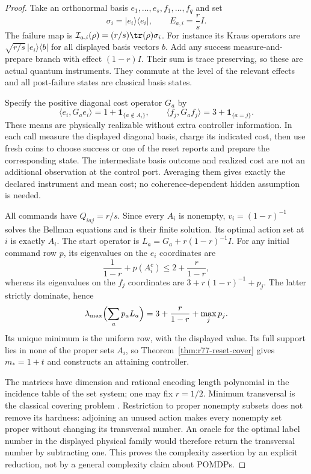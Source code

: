 \begin{proof}
Take an orthonormal basis $e_1,\ldots,e_s,f_1,\ldots,f_q$ and set
\[
 \sigma_i=|e_i\rangle\langle e_i|,
 \qquad E_{a,i}=\frac r s I.
\]
The failure map is $\mathcal I_{a,i}(\rho)=(r/s)\tr(\rho)\sigma_i$.
For instance its Kraus operators are
$\sqrt{r/s}\,|e_i\rangle\langle b|$ for all displayed basis vectors
$b$.  Add any success measure-and-prepare branch with effect $(1-r)I$.
Their sum is trace preserving, so these are actual quantum instruments.
They commute at the level of the relevant effects and all post-failure
states are classical basis states.

Specify the positive diagonal cost operator $G_a$ by
\[
 \langle e_i,G_ae_i\rangle=1+\mathbf1_{\{a\notin A_i\}},
 \qquad
 \langle f_j,G_af_j\rangle=3+\mathbf1_{\{a=j\}}.
\]
These means are physically realizable without extra controller
information.  In each call measure the displayed diagonal basis,
charge its indicated cost, then use fresh coins to choose success or
one of the reset reports and prepare the corresponding state.  The
intermediate basis outcome and realized cost are not an additional
observation at the control port.  Averaging them gives exactly the
declared instrument and mean cost; no coherence-dependent hidden
assumption is needed.

All commands have $Q_{iaj}=r/s$.  Since every $A_i$ is nonempty,
$v_i=(1-r)^{-1}$ solves the Bellman equations and is their finite
solution.  Its optimal action set at $i$ is exactly $A_i$.
The start operator is $L_a=G_a+r(1-r)^{-1}I$.  For any initial
command row $p$, its eigenvalues on the $e_i$ coordinates are
\[
 \frac1{1-r}+p(A_i^c)\le2+\frac r{1-r},
\]
whereas its eigenvalues on the $f_j$ coordinates are
$3+r(1-r)^{-1}+p_j$.  The latter strictly dominate, hence
\[
 \lambda_{\max}\Bigl(\sum_a p_aL_a\Bigr)
       =3+\frac r{1-r}+\max_j p_j.
\]
Its unique minimum is the uniform row, with the displayed value.
Its full support lies in none of the proper sets $A_i$, so
Theorem~\ref{thm:r77-reset-cover} gives $m_*=1+t$ and constructs an
attaining controller.

The matrices have dimension and rational encoding length polynomial
in the incidence table of the set system; one may fix $r=1/2$.
Minimum transversal is the classical covering problem
\cite{Karp72}.  Restriction to proper nonempty subsets does not remove
its hardness: adjoining an unused action makes every nonempty set
proper without changing its transversal number.  An oracle for the
optimal label number in the displayed physical family would therefore
return the transversal number by subtracting one.  This proves the
complexity assertion by an explicit reduction, not by a general
complexity claim about POMDPs.
\end{proof}

